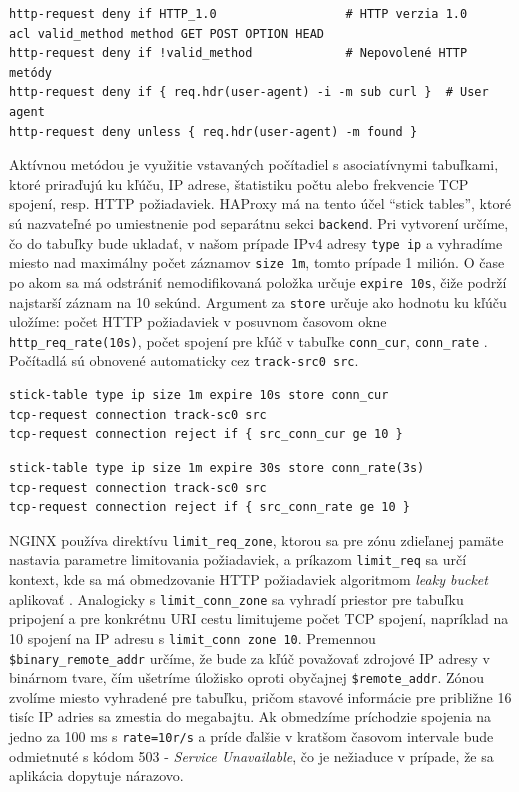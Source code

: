\documentclass[12pt, a4paper]{article}
\begin{document}
\begin{lstlisting}[caption=HAProxy: Zablokovanie HTTP požiadavky podľa jej atribútov]
http-request deny if HTTP_1.0                  # HTTP verzia 1.0
acl valid_method method GET POST OPTION HEAD
http-request deny if !valid_method             # Nepovolené HTTP metódy
http-request deny if { req.hdr(user-agent) -i -m sub curl }  # User agent
http-request deny unless { req.hdr(user-agent) -m found }
\end{lstlisting}

Aktívnou metódou je využitie vstavaných počítadiel s asociatívnymi tabuľkami, ktoré priraďujú ku kľúču,
IP adrese, štatistiku počtu alebo frekvencie TCP spojení, resp. HTTP požiadaviek. HAProxy má na tento
účel \enquote{stick tables}, ktoré sú nazvateľné po umiestnenie pod separátnu sekci \verb|backend|. Pri
vytvorení určíme, čo do tabuľky bude ukladať, v našom prípade IPv4 adresy \verb|type ip| a vyhradíme miesto
nad maximálny počet záznamov \verb|size 1m|, tomto prípade 1 milión. O čase po akom sa má odstrániť 
nemodifikovaná položka určuje \verb|expire 10s|, čiže podrží najstarší záznam na 10 sekúnd. Argument za
\verb|store| určuje ako hodnotu ku kľúču uložíme: počet HTTP požiadaviek v posuvnom časovom okne 
\verb|http_req_rate(10s)|, počet spojení pre kľúč v tabuľke \verb|conn_cur|, \verb|conn_rate| 
\cite{haproxy-stick-tables}. Počítadlá sú obnovené automaticky cez \verb|track-src0 src|.

\begin{lstlisting}[caption=HAProxy: obmedzenie počtu otvorených spojení na IP adresu na 10 zároveň]
stick-table type ip size 1m expire 10s store conn_cur
tcp-request connection track-sc0 src
tcp-request connection reject if { src_conn_cur ge 10 }
\end{lstlisting}

\begin{lstlisting}[caption=HAProxy: obmedzenie frekvencie pripojení na používateľa]
stick-table type ip size 1m expire 30s store conn_rate(3s)
tcp-request connection track-sc0 src
tcp-request connection reject if { src_conn_rate ge 10 }
\end{lstlisting}

NGINX používa direktívu \verb|limit_req_zone|, ktorou sa pre zónu zdieľanej pamäte nastavia parametre
limitovania požiadaviek, a príkazom \verb|limit_req| sa určí kontext, kde sa má obmedzovanie HTTP požiadaviek 
algoritmom \emph{leaky bucket} aplikovať \cite{nginx-rate-limiting}. Analogicky s \verb|limit_conn_zone| sa 
vyhradí priestor pre tabuľku pripojení a pre konkrétnu URI cestu limitujeme počet TCP spojení, napríklad na 
10 spojení na IP adresu s \verb|limit_conn zone 10|. Premennou \verb|$binary_remote_addr| určíme, že bude za 
kľúč považovať zdrojové IP adresy v binárnom tvare, čím ušetríme úložisko oproti obyčajnej
\verb|$remote_addr|. Zónou zvolíme miesto vyhradené pre tabuľku, pričom stavové informácie pre približne 16 
tisíc IP adries sa zmestia do megabajtu. Ak obmedzíme príchodzie spojenia na jedno za 100 ms s 
\verb|rate=10r/s| a príde ďalšie v kratšom časovom intervale bude odmietnuté s kódom 503 - 
\emph{Service Unavailable}, čo je nežiaduce v prípade, že sa aplikácia dopytuje nárazovo. 
\end{document}
